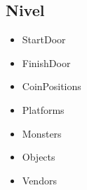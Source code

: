 \subsection{Nivel}
\begin{itemize}
    \item StartDoor
    \item FinishDoor
    \item CoinPositions
    \item Platforms
    \item Monsters
    \item Objects
    \item Vendors
\end{itemize}